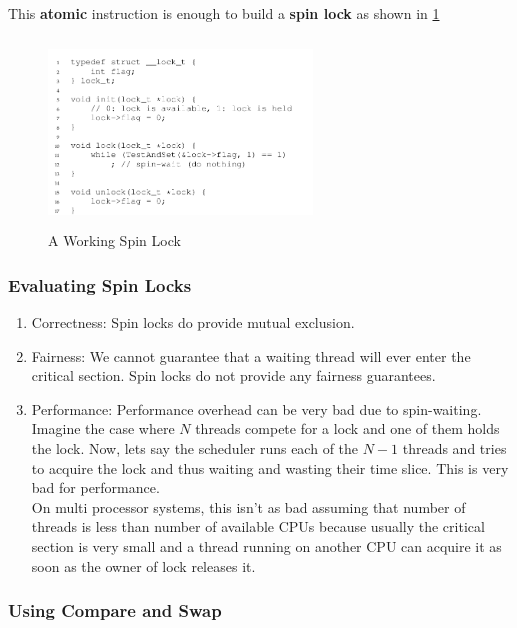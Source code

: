This \textbf{atomic} instruction is enough to build a \textbf{spin lock} as
shown in \ref{283}

\begin{figure}[h!]
    \label{283}
    \begin{center}
        \includegraphics[width=7cm, height=5cm]{img/283.png}
        \caption{A Working Spin Lock}
    \end{center}
\end{figure}

\subsubsection{Evaluating Spin Locks}

\begin{enumerate}
    \item Correctness: Spin locks do provide mutual exclusion.
    \item Fairness: We cannot guarantee that a waiting thread will ever enter
        the critical section. Spin locks do not provide any fairness guarantees.
    \item Performance: Performance overhead can be very bad due to spin-waiting.
        Imagine the case where $N$ threads compete for a lock and one of them holds
        the lock. Now, lets say the scheduler runs each of the $N - 1$ threads
        and tries to acquire the lock and thus waiting and wasting their time
        slice. This is very bad for performance.\\

        On multi processor systems, this isn't as bad assuming that number of
        threads is less than number of available CPUs because usually the critical
        section is very small and a thread running on another CPU can acquire
        it as soon as the owner of lock releases it.
\end{enumerate}

\subsubsection{Using Compare and Swap}

